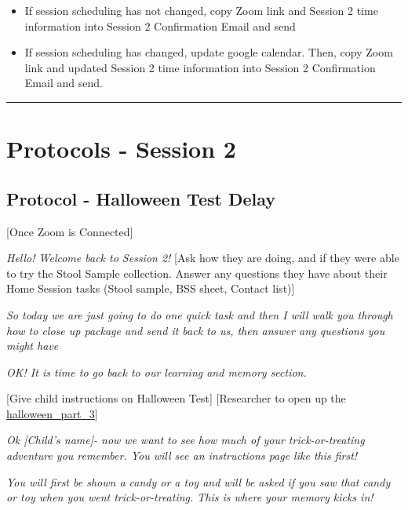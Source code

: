 \documentclass[]{book}
\providecommand{\tightlist}{%
  \setlength{\itemsep}{0pt}\setlength{\parskip}{0pt}}
\begin{document}
\begin{itemize}
\tightlist
\item
  If session scheduling has not changed, copy Zoom link and Session 2 time information into Session 2 Confirmation Email and send
\item
  If session scheduling has changed, update google calendar. Then, copy Zoom link and updated Session 2 time information into Session 2 Confirmation Email and send.
\end{itemize}

\begin{center}\rule{0.5\linewidth}{0.5pt}\end{center}

\hypertarget{protocols---session-2}{%
\section{Protocols - Session 2}\label{protocols---session-2}}

\hypertarget{protocol---halloween-test-delay}{%
\subsection{Protocol - Halloween Test Delay}\label{protocol---halloween-test-delay}}

{[}Once Zoom is Connected{]}

\emph{Hello! Welcome back to Session 2!} {[}Ask how they are doing, and if they were able to try the Stool Sample collection. Answer any questions they have about their Home Session tasks (Stool sample, BSS sheet, Contact list){]}

\emph{So today we are just going to do one quick task and then I will walk you through how to close up package and send it back to us, then answer any questions you might have}

\emph{OK! It is time to go back to our learning and memory section.}

{[}Give child instructions on Halloween Test{]} {[}Researcher to open up the \href{https://ucla.app.box.com/file/737558206552}{halloween\_part\_3}{]}

\emph{Ok {[}Child's name{]}- now we want to see how much of your trick-or-treating adventure you remember. You will see an instructions page like this first!}

\emph{You will first be shown a candy or a toy and will be asked if you saw that candy or toy when you went trick-or-treating. This is where your memory kicks in!}
\end{document}
